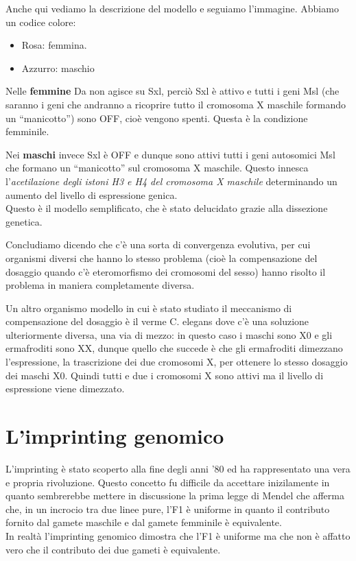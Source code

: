 \documentclass[11pt]{book}
\begin{document}
Anche qui vediamo la descrizione del modello e seguiamo l’immagine.
Abbiamo un codice colore:
\begin{itemize}
\item Rosa: femmina.
\item Azzurro: maschio
\end{itemize}
 
Nelle \textbf{femmine} Da non agisce su Sxl, perciò Sxl è attivo e tutti i geni Msl (che saranno i geni che andranno a ricoprire tutto il cromosoma X maschile formando un ``manicotto'') sono OFF, cioè vengono spenti. Questa è la condizione femminile.

Nei \textbf{maschi} invece Sxl è OFF e dunque sono attivi tutti i geni autosomici Msl che formano un ``manicotto'' sul cromosoma X maschile. Questo innesca l’\emph{acetilazione degli istoni H3 e H4 del cromosoma X maschile} determinando un aumento del livello di espressione genica.\\
Questo è il modello semplificato, che è stato delucidato grazie alla dissezione genetica. 

Concludiamo dicendo che c’è una sorta di convergenza evolutiva, per cui organismi diversi che hanno lo stesso problema (cioè la compensazione del dosaggio quando c’è eteromorfismo dei cromosomi del sesso) hanno risolto il problema in maniera completamente diversa.

Un altro organismo modello in cui è stato studiato il meccanismo di compensazione del dosaggio è il verme C. elegans dove c’è una soluzione ulteriormente diversa, una via di mezzo: in questo caso  i maschi sono X0 e gli ermafroditi sono XX, dunque quello che succede è che gli ermafroditi dimezzano l’espressione, la trascrizione dei due cromosomi X, per ottenere lo stesso dosaggio dei maschi X0. Quindi tutti e due i cromosomi X sono attivi ma il livello di espressione viene dimezzato.


\chapter{L’imprinting genomico}
L’imprinting è stato scoperto alla fine degli anni '80 ed ha rappresentato una vera e propria rivoluzione. Questo concetto fu difficile da accettare inizilamente in quanto sembrerebbe mettere in discussione la prima legge di Mendel che afferma che, in un incrocio tra due linee pure, l’F1 è uniforme in quanto il contributo fornito dal gamete maschile e dal gamete femminile è equivalente.\\
In realtà l’imprinting genomico dimostra che l’F1 è uniforme ma che non è affatto vero che il contributo dei due gameti è equivalente.
\end{document}
